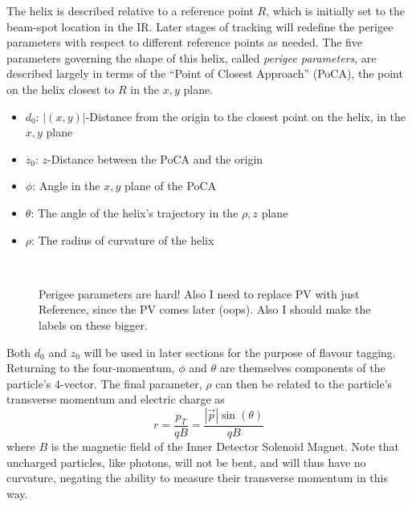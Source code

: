             The helix is described relative to a reference point $R$,
                which is initially set to the beam-spot location in the IR.
            Later stages of tracking will redefine the perigee parameters with respect to different reference points as needed.
            The five parameters governing the shape of this helix, called \textit{perigee parameters}, 
                are described largely in terms of the ``Point of Closest Approach'' (PoCA),
                the point on the helix closest to $R$ in the $x,y$ plane.
            \begin{itemize}
                \item $d_0$: $|(x,y)|$-Distance from the origin to the closest point on the helix, in the $x,y$ plane
                \item $z_0$: $z$-Distance between the PoCA and the origin
                \item $\phi$: Angle in the $x,y$ plane of the PoCA
                \item $\theta$: The angle of the helix's trajectory in the $\rho,z$ plane
                \item $\rho$: The radius of curvature of the helix
            \end{itemize}

            \begin{figure}
                \\
                \caption{
                    Perigee parameters are hard! Also I need to replace PV with just Reference, since the PV comes later (oops).
                    Also I should make the labels on these bigger.
                }
                \label{fig:perigee_params}
            \end{figure}

            Both $d_0$ and $z_0$ will be used in later sections for the purpose of flavour tagging.
            Returning to the four-momentum, $\phi$ and $\theta$ are themselves components of the particle's 4-vector.
            The final parameter, $\rho$ can then be related to the particle's transverse momentum and electric charge as
            \begin{equation}
            r = \frac{p_T}{qB} = \frac{|\vec{p}| \sin(\theta)}{qB}
            \end{equation}
            where $B$ is the magnetic field of the Inner Detector Solenoid Magnet\cite{thesis_track_sim_and_reco}.
            Note that uncharged particles, like photons, will not be bent, and will thus have no curvature,
                negating the ability to measure their transverse momentum in this way.

